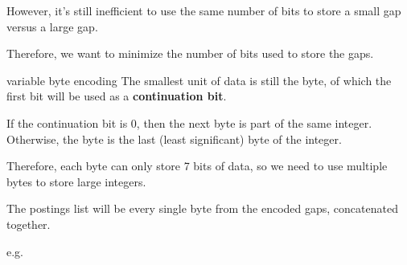 However, it's still inefficient to use the same number of bits to store a small gap versus a large gap.

Therefore, we want to minimize the number of bits used to store the gaps.

\begin{defn}{variable byte encoding}
    The smallest unit of data is still the byte, of which the first bit will be used as a \textbf{continuation bit}.

    If the continuation bit is 0, then the next byte is part of the same integer.
    Otherwise, the byte is the last (least significant) byte of the integer.

    Therefore, each byte can only store 7 bits of data, so we need to use multiple bytes to store large integers.

    The postings list will be every single byte from the encoded gaps, concatenated together.

    e.g.

     \\
\end{defn}